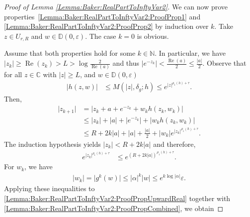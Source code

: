 \documentclass[a4paper, 12pt, twoside]{amsart}
\theoremstyle{definition}
\numberwithin{equation}{section}
\renewcommand{\Re}{\operatorname{Re}}
\newcommand{\D}{{\mathbb D}}
\begin{document}
\begin{proof}[Proof of Lemma {\ref{Lemma:Baker:RealPartToInftyVar2}}]
	We can now prove properties~\eqref{Lemma:Baker:RealPartToInftyVar2:ProofProp1} and \eqref{Lemma:Baker:RealPartToInftyVar2:ProofProp2} by induction over $k$. Take  $z \in U_{r,R}$ and $ w \in \D(0,\varepsilon)$. The case $k=0$ is obvious.
	
	Assume that both properties hold for some $k\in\mathbb{N}$. In particular, we have $\lvert z_k \rvert \geq \Re(z_k) > L > \log \frac{2}{\Re(a)}$ and thus $\left\lvert e^{-z_k} \right\rvert < \frac{\Re(a)}{2} \leq \frac{\lvert a \rvert}{2} $. 
	Observe that for all $z \in \mathbb{C}$ with $\lvert z \rvert \geq L$, and $w \in \D(0,\varepsilon)$
	\begin{equation}
		\label{Lemma:Baker:RealPartToInftyVar2:ErrorEquation}
		\begin{split}
			\lvert h(z,w) \rvert &\leq M(\lvert z \rvert, \delta_g;h) \leq e^{\lvert z \rvert^{\rho_1(h) + \tau}}.
		\end{split}
	\end{equation}
	Then,
	\begin{equation}
		\label{Lemma:Baker:RealPartToInftyVar2:ProofPropUpwardReal}
		\begin{split}
			\lvert z_{k+1} \rvert &= \left\lvert z_k + a + e^{-z_k} + w_k h(z_k, w_k) \right\rvert \\
			&\leq \lvert z_{k} \rvert + \lvert a \rvert + \left\lvert e^{-z_k} \right\rvert + \lvert w_k h(z_k, w_k) \rvert \\
			&\leq R + 2k \lvert a \rvert + \lvert a \rvert +  \frac{\lvert a \rvert}{2} + \lvert w_k \rvert  e^{\lvert z_k \rvert^{\rho_1(h) + \tau}}.
		\end{split}
	\end{equation}
	The induction hypothesis yields $\lvert z_k \rvert < R + 2k \lvert a \rvert$ and therefore,
	\begin{equation*}
		\begin{split}
			e^{\lvert z_k \rvert^{\rho_1(h) + \tau}} &\leq e^{( R + 2k \lvert a \rvert )^{\rho_1(h) + \tau}}.
		\end{split}
	\end{equation*}
	For $w_k$, we have
	\begin{equation*}
		\begin{split}
			\lvert w_k \rvert = \lvert g^k(w) \rvert \leq \lvert \alpha \rvert^k \lvert w \rvert \leq e^{k \log \lvert \alpha \rvert} \varepsilon.
		\end{split}
	\end{equation*}
	Applying these inequalities to \eqref{Lemma:Baker:RealPartToInftyVar2:ProofPropUpwardReal} together with \eqref{Lemma:Baker:RealPartToInftyVar2:ProofPropCombined}, we obtain

\end{proof}
\end{document}
